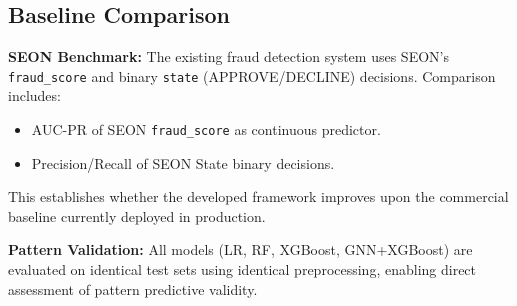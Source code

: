 \subsection{Baseline Comparison}

\textbf{SEON Benchmark:} The existing fraud detection system uses SEON's \texttt{fraud\_score} and binary \texttt{state} (APPROVE/DECLINE) decisions. Comparison includes:

\begin{itemize}
    \item AUC-PR of SEON \texttt{fraud\_score} as continuous predictor.
    \item Precision/Recall of SEON State binary decisions.
\end{itemize}

This establishes whether the developed framework improves upon the commercial baseline currently deployed in production.

\textbf{Pattern Validation:} All models (LR, RF, XGBoost, GNN+XGBoost) are evaluated on identical test sets using identical preprocessing, enabling direct assessment of pattern predictive validity.
